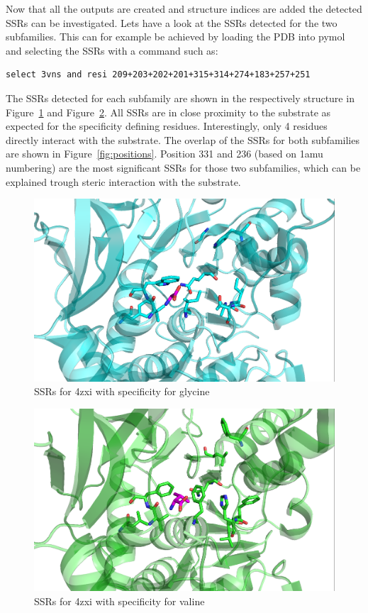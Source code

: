 \documentclass[a4paper,10pt]{article}
\begin{document}
Now that all the outputs are created and structure indices are added the detected SSRs can be investigated.
Lets have a look at the SSRs detected for the two subfamilies. This can for example be achieved by 
loading the PDB into pymol and selecting the SSRs with a command such as:

\begin{verbatim} 
select 3vns and resi 209+203+202+201+315+314+274+183+257+251
\end{verbatim}

The SSRs detected for each subfamily are shown in the respectively structure in Figure~\ref{fig:G_res} and Figure~\ref{fig:V_res}.
All SSRs are in close proximity to the substrate as expected for the specificity defining residues. Interestingly, only 4 residues 
directly interact with the substrate. The overlap of the SSRs for both subfamilies are shown in Figure~\ref{fig:positions}.
Position 331 and 236 (based on 1amu numbering) are the most significant SSRs for those two subfamilies, 
which can be explained trough steric interaction with the substrate.

\begin{figure}
  \includegraphics[width=\linewidth]{./figs/G_res}
  \caption{SSRs for 4zxi with specificity for glycine}
  \label{fig:G_res}
\end{figure}

\begin{figure}
  \includegraphics[width=\linewidth]{./figs/V_res}
  \caption{SSRs for 4zxi with specificity for valine}
  \label{fig:V_res}
\end{figure}
\end{document}
